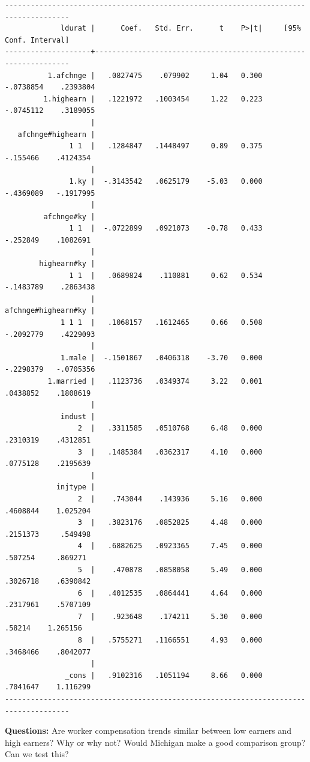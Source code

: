 \documentclass[
]{book}
\begin{document}
\begin{verbatim}
-------------------------------------------------------------------------------------
             ldurat |      Coef.   Std. Err.      t    P>|t|     [95% Conf. Interval]
--------------------+----------------------------------------------------------------
          1.afchnge |   .0827475    .079902     1.04   0.300    -.0738854    .2393804
         1.highearn |   .1221972   .1003454     1.22   0.223    -.0745112    .3189055
                    |
   afchnge#highearn |
               1 1  |   .1284847   .1448497     0.89   0.375     -.155466    .4124354
                    |
               1.ky |  -.3143542   .0625179    -5.03   0.000    -.4369089   -.1917995
                    |
         afchnge#ky |
               1 1  |  -.0722899   .0921073    -0.78   0.433     -.252849    .1082691
                    |
        highearn#ky |
               1 1  |   .0689824    .110881     0.62   0.534    -.1483789    .2863438
                    |
afchnge#highearn#ky |
             1 1 1  |   .1068157   .1612465     0.66   0.508    -.2092779    .4229093
                    |
             1.male |  -.1501867   .0406318    -3.70   0.000    -.2298379   -.0705356
          1.married |   .1123736   .0349374     3.22   0.001     .0438852    .1808619
                    |
             indust |
                 2  |   .3311585   .0510768     6.48   0.000     .2310319    .4312851
                 3  |   .1485384   .0362317     4.10   0.000     .0775128    .2195639
                    |
            injtype |
                 2  |    .743044    .143936     5.16   0.000     .4608844    1.025204
                 3  |   .3823176   .0852825     4.48   0.000     .2151373     .549498
                 4  |   .6882625   .0923365     7.45   0.000      .507254     .869271
                 5  |    .470878   .0858058     5.49   0.000     .3026718    .6390842
                 6  |   .4012535   .0864441     4.64   0.000     .2317961    .5707109
                 7  |    .923648    .174211     5.30   0.000       .58214    1.265156
                 8  |   .5755271   .1166551     4.93   0.000     .3468466    .8042077
                    |
              _cons |   .9102316   .1051194     8.66   0.000     .7041647    1.116299
-------------------------------------------------------------------------------------
\end{verbatim}

\textbf{Questions:} Are worker compensation trends similar between low earners and high earners? Why or why not? Would Michigan make a good comparison group? Can we test this?
\end{document}
